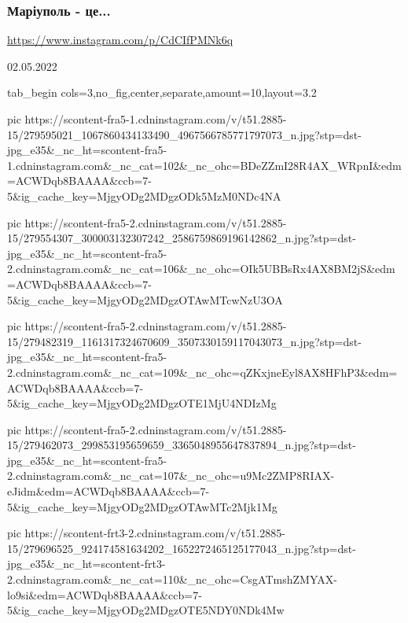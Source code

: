  
 
 
 
 

\subsubsection{Маріуполь - це...}

\url{https://www.instagram.com/p/CdCIfPMNk6q}

02.05.2022

\ifcmt
  tab_begin cols=3,no_fig,center,separate,amount=10,layout=3.2

     pic https://scontent-fra5-1.cdninstagram.com/v/t51.2885-15/279595021_1067860434133490_4967566785771797073_n.jpg?stp=dst-jpg_e35&_nc_ht=scontent-fra5-1.cdninstagram.com&_nc_cat=102&_nc_ohc=BDeZZmI28R4AX_WRpnI&edm=ACWDqb8BAAAA&ccb=7-5&ig_cache_key=MjgyODg2MDgzODk5MzM0NDc4NA%

     pic https://scontent-fra5-2.cdninstagram.com/v/t51.2885-15/279554307_300003132307242_2586759869196142862_n.jpg?stp=dst-jpg_e35&_nc_ht=scontent-fra5-2.cdninstagram.com&_nc_cat=106&_nc_ohc=OIk5UBBsRx4AX8BM2jS&edm=ACWDqb8BAAAA&ccb=7-5&ig_cache_key=MjgyODg2MDgzOTAwMTcwNzU3OA%

     pic https://scontent-fra5-2.cdninstagram.com/v/t51.2885-15/279482319_1161317324670609_3507330159117043073_n.jpg?stp=dst-jpg_e35&_nc_ht=scontent-fra5-2.cdninstagram.com&_nc_cat=109&_nc_ohc=qZKxjneEyl8AX8HFhP3&edm=ACWDqb8BAAAA&ccb=7-5&ig_cache_key=MjgyODg2MDgzOTE1MjU4NDIzMg%

     pic https://scontent-fra5-2.cdninstagram.com/v/t51.2885-15/279462073_299853195659659_3365048955647837894_n.jpg?stp=dst-jpg_e35&_nc_ht=scontent-fra5-2.cdninstagram.com&_nc_cat=107&_nc_ohc=u9Mc2ZMP8RIAX-eJidm&edm=ACWDqb8BAAAA&ccb=7-5&ig_cache_key=MjgyODg2MDgzOTAwMTc2Mjk1Mg%

     pic https://scontent-frt3-2.cdninstagram.com/v/t51.2885-15/279696525_924174581634202_1652272465125177043_n.jpg?stp=dst-jpg_e35&_nc_ht=scontent-frt3-2.cdninstagram.com&_nc_cat=110&_nc_ohc=CsgATmshZMYAX-lo9si&edm=ACWDqb8BAAAA&ccb=7-5&ig_cache_key=MjgyODg2MDgzOTE5NDY0NDk4Mw%


